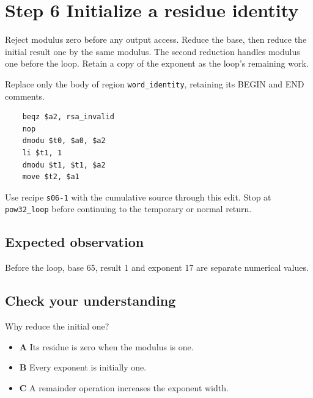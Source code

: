 \section{Step 6 Initialize a residue identity}\label{rsa-s06}

Reject modulus zero before any output access. Reduce the base, then reduce the initial result one by the same modulus. The second reduction handles modulus one before the loop. Retain a copy of the exponent as the loop's remaining work.

Replace only the body of region \texttt{word\_identity}, retaining its BEGIN and END comments.

\begin{verbatim}
    beqz $a2, rsa_invalid
    nop
    dmodu $t0, $a0, $a2
    li $t1, 1
    dmodu $t1, $t1, $a2
    move $t2, $a1
\end{verbatim}

Use recipe \texttt{s06-1} with the cumulative source through this edit. Stop at \texttt{pow32\_loop} before continuing to the temporary or normal return.

\subsection{Expected observation}
Before the loop, base 65, result 1 and exponent 17 are separate numerical values.

\subsection{Check your understanding}
Why reduce the initial one?

\begin{itemize}
\item \textbf{A} Its residue is zero when the modulus is one.
\item \textbf{B} Every exponent is initially one.
\item \textbf{C} A remainder operation increases the exponent width.
\end{itemize}
